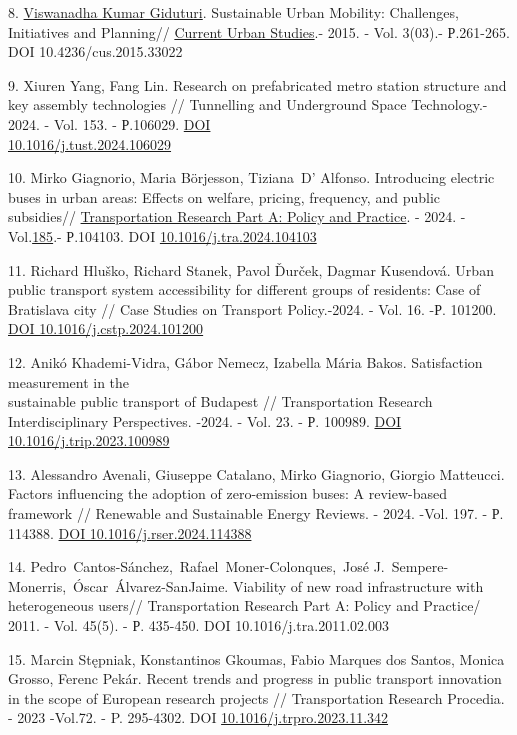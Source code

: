 \begin{references}
8. \href{https://www.researchgate.net/profile/Viswanadha-Giduturi?_tp=eyJjb250ZXh0Ijp7ImZpcnN0UGFnZSI6InB1YmxpY2F0aW9uIiwicGFnZSI6InB1YmxpY2F0aW9uIn19}{Viswanadha
Kumar Giduturi}. Sustainable Urban Mobility: Challenges, Initiatives
and Planning//
\href{https://www.researchgate.net/journal/Current-Urban-Studies-2328-4919?_tp=eyJjb250ZXh0Ijp7ImZpcnN0UGFnZSI6InB1YmxpY2F0aW9uIiwicGFnZSI6InB1YmxpY2F0aW9uIn19}{Current
Urban Studies}.- 2015. - Vol. 3(03).- Р.261-265. DOI
10.4236/cus.2015.33022

9. Xiuren Yang, Fang Lin. Research on prefabricated metro station
structure and key assembly technologies // Tunnelling and Underground
Space Technology.- 2024. - Vol. 153. - Р.106029.
\href{https://doi.org/10.1016/j.tust.2024.106029}{DOI\\
10.1016/j.tust.2024.106029}

10. Mirko Giagnorio, Maria Börjesson, Tiziana~D' Alfonso.
Introducing electric buses in urban areas: Effects on welfare,
pricing, frequency, and public subsidies//
\href{https://www.sciencedirect.com/journal/transportation-research-part-a-policy-and-practice}{Transportation
Research Part A: Policy and Practice}. - 2024. -
Vol.\href{https://www.sciencedirect.com/journal/transportation-research-part-a-policy-and-practice/vol/185/suppl/C}{185}.-
Р.104103. DOI
\href{https://doi.org/10.1016/j.tra.2024.104103}{10.1016/j.tra.2024.104103}

11. Richard Hluško, Richard Stanek, Pavol Ďurček, Dagmar Kusendová. Urban
public transport system accessibility for different groups of
residents: Case of Bratislava city // Case Studies on Transport
Policy.-2024. - Vol. 16. -Р. 101200.
\href{https://doi.org/10.1016/j.cstp.2024.101200}{DOI
10.1016/j.cstp.2024.101200}

12. Anikó Khademi-Vidra, Gábor Nemecz, Izabella Mária Bakos. Satisfaction
measurement in the \\sustainable public transport of Budapest //
Transportation Research Interdisciplinary Perspectives. -2024. - Vol.
23. - Р. 100989. \href{https://doi.org/10.1016/j.trip.2023.100989}{DOI
10.1016/j.trip.2023.100989}

13. Alessandro Avenali, Giuseppe Catalano, Mirko Giagnorio, Giorgio
Matteucci. Factors influencing the adoption of zero-emission buses: A
review-based framework // Renewable and Sustainable Energy Reviews. -
2024. -Vol. 197. - Р. 114388.
\href{https://doi.org/10.1016/j.rser.2024.114388}{DOI
10.1016/j.rser.2024.114388}

14. Pedro~Cantos-Sánchez,~Rafael~Moner-Colonques,~José
J.~Sempere-Monerris,~Óscar~Álvarez-SanJaime. Viability of new road
infrastructure with heterogeneous users// Transportation Research Part
A: Policy and Practice/ 2011. - Vol. 45(5). - Р. 435-450. DOI
10.1016/j.tra.2011.02.003

15. Marcin Stępniak, Konstantinos Gkoumas, Fabio Marques dos Santos,
Monica Grosso, Ferenc Pekár. Recent trends and progress in public
transport innovation in the scope of European research
projects // Transportation Research Procedia. - 2023 -Vol.72. - P.
295-4302. DOI \href{https://doi.org/10.1016/j.trpro.2023.11.342}{10.1016/j.trpro.2023.11.342}
\end{references}

